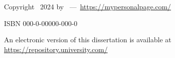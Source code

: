 \begin{titlepage}
\vspace{\bigskipamount}

\noindent Copyright \textcopyright\ 2024 by \makeatletter{\@firstname\ \@lastname}\makeatother\ ---\ \url{https://mypersonalpage.com/}

\medskip

\noindent ISBN 000-0-00000-000-0

\medskip
\noindent An electronic version of this dissertation is available at \\
\url{https://repository.university.com/}

\end{titlepage}